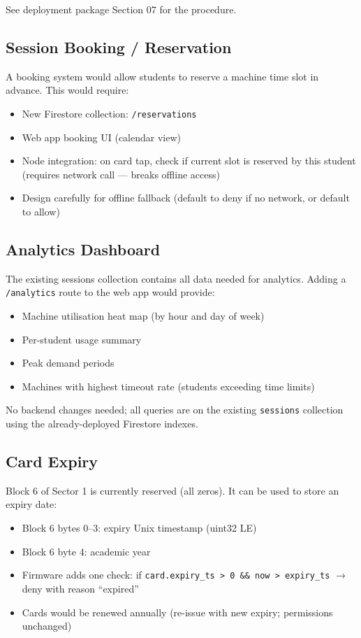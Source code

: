 See deployment package Section 07 for the procedure.

\subsection{Session Booking / Reservation}

A booking system would allow students to reserve a machine time slot in advance. This would require:
\begin{itemize}[leftmargin=1.5em]
    \item New Firestore collection: \texttt{/reservations}
    \item Web app booking UI (calendar view)
    \item Node integration: on card tap, check if current slot is reserved by this student (requires network call --- breaks offline access)
    \item Design carefully for offline fallback (default to deny if no network, or default to allow)
\end{itemize}

\subsection{Analytics Dashboard}

The existing sessions collection contains all data needed for analytics. Adding a \texttt{/analytics} route to the web app would provide:
\begin{itemize}[leftmargin=1.5em]
    \item Machine utilisation heat map (by hour and day of week)
    \item Per-student usage summary
    \item Peak demand periods
    \item Machines with highest timeout rate (students exceeding time limits)
\end{itemize}

No backend changes needed; all queries are on the existing \texttt{sessions} collection using the already-deployed Firestore indexes.

\subsection{Card Expiry}

Block 6 of Sector 1 is currently reserved (all zeros). It can be used to store an expiry date:
\begin{itemize}[leftmargin=1.5em]
    \item Block 6 bytes 0--3: expiry Unix timestamp (uint32 LE)
    \item Block 6 byte 4: academic year
    \item Firmware adds one check: if \texttt{card.expiry\_ts > 0 \&\& now > expiry\_ts} $\rightarrow$ deny with reason ``expired''
    \item Cards would be renewed annually (re-issue with new expiry; permissions unchanged)
\end{itemize}

